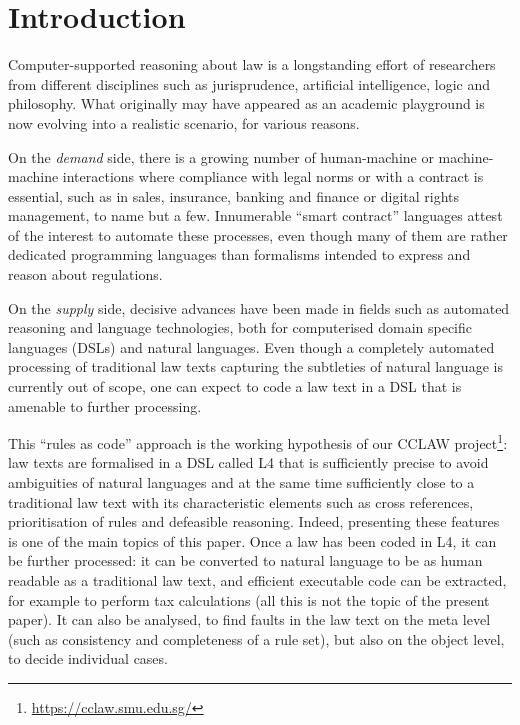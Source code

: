 \section{Introduction}\label{sec:introduction}

Computer-supported reasoning about law is a longstanding effort of researchers
from different disciplines such as jurisprudence, artificial intelligence, logic and
philosophy. What originally may have appeared as an academic playground is
now evolving into a realistic scenario, for various reasons. 

On the \emph{demand} side, there is a growing number of human-machine or
machine-machine interactions where compliance with legal norms or with a contract is essential,
such as in sales, insurance, banking and finance or digital rights management, to name but
a few. Innumerable ``smart contract'' languages attest of the interest to
automate these processes, even though many of them are rather dedicated
programming languages than formalisms intended to express and reason about
regulations.

On the \emph{supply} side, decisive advances have been made in fields such as
automated reasoning and language technologies, both for computerised domain
specific languages (DSLs) and natural languages. Even though a completely
automated processing of traditional law texts capturing the subtleties of
natural language is currently out of scope, one can expect to code a law text
in a DSL that is amenable to further processing.

This ``rules as code'' approach is the working hypothesis of our CCLAW
project\footnote{\url{https://cclaw.smu.edu.sg/}}: law texts are formalised in
a DSL called L4 that is sufficiently precise to avoid ambiguities of natural
languages and at the same time sufficiently close to a traditional law text
with its characteristic elements such as cross references, prioritisation of
rules and defeasible reasoning. Indeed, presenting these features is one of
the main topics of this paper. Once a law has been coded in L4, it can
be further processed: it can be converted to natural language \cite{listemnmaa2021cnl} to
be as human readable as a traditional law text, and efficient executable code can be
extracted, for example to perform tax calculations (all this is not the topic
of the present paper). It can also be analysed, to find faults in the law
text on the meta level (such as consistency and completeness of a rule set),
but also on the object level, to decide individual cases.

